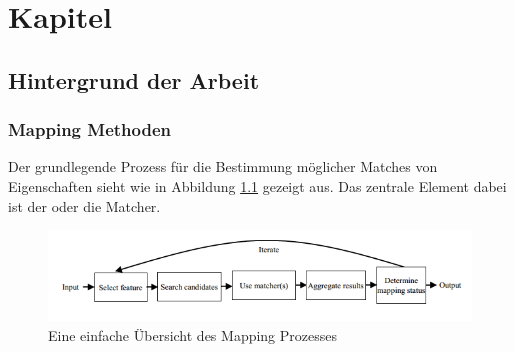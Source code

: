 %
\chapter{Kapitel}
\label{chap:chapters} 

		\section{Hintergrund der Arbeit}
		\subsection{Mapping Methoden}
		Der grundlegende Prozess für die Bestimmung möglicher Matches von Eigenschaften
		sieht wie in Abbildung \ref{fig1} gezeigt aus. Das zentrale Element dabei ist
		der oder die Matcher. \cite{Hoo14}
		
		\begin{figure}[ht]
		\centering
		\includegraphics[width=1.0\textwidth]{pics/simple-high-level-view-of-a-mapping-process.png}
		\caption{Eine einfache Übersicht des Mapping Prozesses \cite{Hoo14}}
		\label{fig1}
		\end{figure}
		
